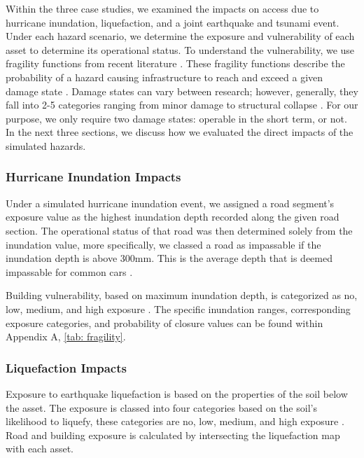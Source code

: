 \documentclass[review,3p,times,onecolumn,sort&compress,12pt]{elsarticle}
\let \cite \parencite
\begin{document}
Within the three case studies, we examined the impacts on access due to hurricane inundation, liquefaction, and a joint earthquake and tsunami event.
Under each hazard scenario, we determine the exposure and vulnerability of each asset to determine its operational status.
To understand the vulnerability, we use fragility functions from recent literature \cite{suppasri2013building, williams2020tsunami, Wang_Chaofeng2021-jc, lin2018empirical, Pregnolato2017-gn, Nofal2020-ti}.
These fragility functions describe the probability of a hazard causing infrastructure to reach and exceed a given damage state \cite{charvet2014empirical,lin2018empirical}.
Damage states can vary between research; however, generally, they fall into 2-5 categories ranging from minor damage to structural collapse \cite{lin2018empirical,suppasri2013building}. 
For our purpose, we only require two damage states: operable in the short term, or not. 
In the next three sections, we discuss how we evaluated the direct impacts of the simulated hazards.


\subsubsection{Hurricane Inundation Impacts}
Under a simulated hurricane inundation event, we assigned a road segment's exposure value as the highest inundation depth recorded along the given road section.
The operational status of that road was then determined solely from the inundation value, more specifically, we classed a road as impassable if the inundation depth is above 300mm.
This is the average depth that is deemed impassable for common cars \cite{Pregnolato2017-gn}.

Building vulnerability, based on maximum inundation depth, is categorized as no, low, medium, and high exposure \cite{Nofal2020-ti}.
The specific inundation ranges, corresponding exposure categories, and probability of closure values can be found within Appendix A, \autoref{tab: fragility}. %

\subsubsection{Liquefaction Impacts}
Exposure to earthquake liquefaction is based on the properties of the soil below the asset.
The exposure is classed into four categories based on the soil's likelihood to liquefy, these categories are no, low, medium, and high exposure \cite{Wang_Chaofeng2021-jc, lin2018empirical}.
Road and building exposure is calculated by intersecting the liquefaction map with each asset.
\end{document}
